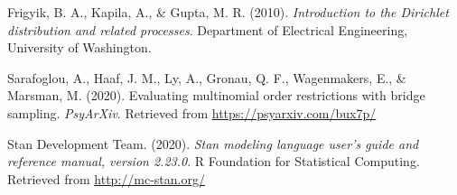 \begin{appendix}
\begingroup
\setlength{\parindent}{-0.5in}
\setlength{\leftskip}{0.5in}

\hypertarget{refs}{}
\leavevmode\hypertarget{ref-frigyik2010introduction}{}%
Frigyik, B. A., Kapila, A., \& Gupta, M. R. (2010). \emph{Introduction
to the Dirichlet distribution and related processes}. Department of
Electrical Engineering, University of Washington.

\leavevmode\hypertarget{ref-sarafoglou2020evaluatingPreprint}{}%
Sarafoglou, A., Haaf, J. M., Ly, A., Gronau, Q. F., Wagenmakers, E., \&
Marsman, M. (2020). Evaluating multinomial order restrictions with
bridge sampling. \emph{PsyArXiv}. Retrieved from
\url{https://psyarxiv.com/bux7p/}

\leavevmode\hypertarget{ref-stan2020}{}%
Stan Development Team. (2020). \emph{Stan modeling language user's guide
and reference manual, version 2.23.0}. R Foundation for Statistical
Computing. Retrieved from \url{http://mc-stan.org/}

\endgroup
\end{appendix}
